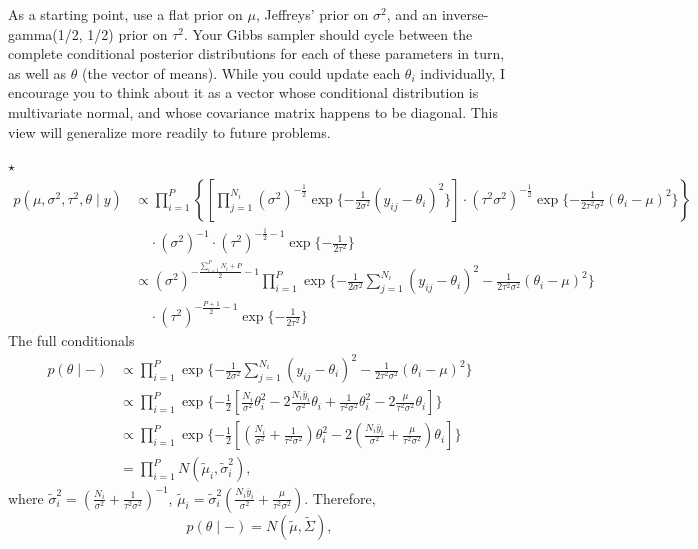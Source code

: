 \documentclass[11pt]{article}
\newcommand{\jie}{$\star$ }
\newcommand{\half}{\frac{1}{2}}
\begin{document}
\begin{enumerate}[(A)]
As a starting point, use a flat prior on $\mu$, Jeffreys' prior on $\sigma^2$, and an inverse-gamma(1/2, 1/2) prior on $\tau^2$.  Your Gibbs sampler should cycle between the complete conditional posterior distributions for each of these parameters in turn, as well as $\theta$ (the vector of means).  While you could update each $\theta_i$ individually, I encourage you to think about it as a vector whose conditional distribution is multivariate normal, and whose covariance matrix happens to be diagonal.  This view will generalize more readily to future problems.  

\bigskip
\jie
\begin{align*}
    p(\mu, \sigma^2, \tau^2, \theta \mid y) & \propto \prod_{i=1}^P \left\{ \left[\prod_{j=1}^{N_i} (\sigma^2)^{-\half} \exp\{-\frac{1}{2\sigma^2} (y_{ij} - \theta_i)^2\} \right] \cdot (\tau^2 \sigma^2)^{-\half} \exp\{-\frac{1}{2\tau^2 \sigma^2} (\theta_i -\mu)^2\} \right\} \\
    &\;\;\;\; \cdot (\sigma^2)^{-1} \cdot (\tau^2)^{-\half-1} \exp\{-\frac{1}{2\tau^2}\} \\
    &\propto (\sigma^2)^{-\frac{\sum_{i=1}^P N_i + P}{2} - 1} \prod_{i=1}^P \exp \{ -\frac{1}{2\sigma^2} \sum_{j=1}^{N_i} (y_{ij} - \theta_i)^2 - \frac{1}{2\tau^2 \sigma^2} (\theta_i - \mu)^2 \} \\& \;\;\;\; \cdot (\tau^2)^{-\frac{P+1}{2} - 1} \exp\{-\frac{1}{2\tau^2}\}
\end{align*}
The full conditionals
\begin{align*}
    p(\theta \mid -) &\propto \prod_{i=1}^P \exp \{-\frac{1}{2\sigma^2} \sum_{j=1}^{N_i} (y_{ij}-\theta_i)^2 - \frac{1}{2\tau^2 \sigma^2} (\theta_i - \mu)^2 \} \\
    &\propto \prod_{i=1}^P \exp \{ -\frac{1}{2} [\frac{N_i}{\sigma^2} \theta_i^2 - 2\frac{N_i \bar{y}_i}{\sigma^2} \theta_i + \frac{1}{\tau^2 \sigma^2} \theta_i^2 - 2\frac{\mu}{\tau^2 \sigma^2} \theta_i] \} \\
    &\propto \prod_{i=1}^P \exp \{ -\frac{1}{2} [(\frac{N_i}{\sigma^2} + \frac{1}{\tau^2 \sigma^2}) \theta_i^2 - 2(\frac{N_i \bar{y}_i}{\sigma^2} + \frac{\mu}{\tau^2 \sigma^2}) \theta_i] \} \\
    &= \prod_{i=1}^P N(\tilde{\mu}_i, \tilde{\sigma}_i^2),
\end{align*}
where $\tilde{\sigma}_i^2 = (\frac{N_i}{\sigma^2} + \frac{1}{\tau^2 \sigma^2})^{-1}$, $\tilde{\mu}_i  = \tilde{\sigma}_i^2 (\frac{N_i \bar{y}_i}{\sigma^2} + \frac{\mu}{\tau^2 \sigma^2})$.
Therefore,
$$p(\theta \mid -) = N(\tilde{\mu}, \tilde{\Sigma}),$$

\end{enumerate}
\end{document}
